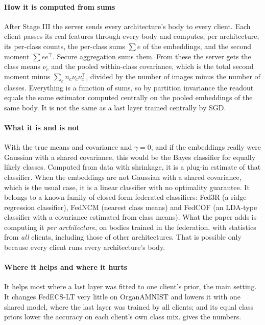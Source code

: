 \paragraph{How it is computed from sums} After Stage III the server sends every architecture's body to every client.
Each client passes its real features through every body and computes, per architecture, its per-class counts, the
per-class sums $\sum e$ of the embeddings, and the second moment $\sum ee^\top$. Secure aggregation sums them. From
these the server gets the class means $\nu_c$ and the pooled within-class covariance, which is the total second moment
minus $\sum_c n_c\nu_c\nu_c^\top$, divided by the number of images minus the number of classes. Everything is a
function of sums, so by partition invariance the readout equals the same estimator computed centrally on the pooled
embeddings of the same body. It is not the same as a last layer trained centrally by SGD.

\paragraph{What it is and is not} With the true means and covariance and $\gamma=0$, and if the embeddings really
were Gaussian with a shared covariance, this would be the Bayes classifier for equally likely classes. Computed from
data with shrinkage, it is a plug-in estimate of that classifier. When the embeddings are not Gaussian with a shared
covariance, which is the usual case, it is a linear classifier with no optimality guarantee. It belongs to a known
family of closed-form federated classifiers: Fed3R (a ridge-regression classifier), FedNCM (nearest class means) and
FedCOF (an LDA-type classifier with a covariance estimated from class means). What the paper adds is computing it
\emph{per architecture}, on bodies trained in the federation, with statistics from \emph{all} clients, including those
of other architectures. That is possible only because every client runs every architecture's body.

\paragraph{Where it helps and where it hurts} It helps most where a last layer was fitted to one client's prior, the
main setting. It changes FedECS-LT very little on OrganAMNIST and lowers it with one shared model, where the last layer
was trained by all clients; and its equal class priors lower the accuracy on each client's own class mix.
 gives the numbers.

